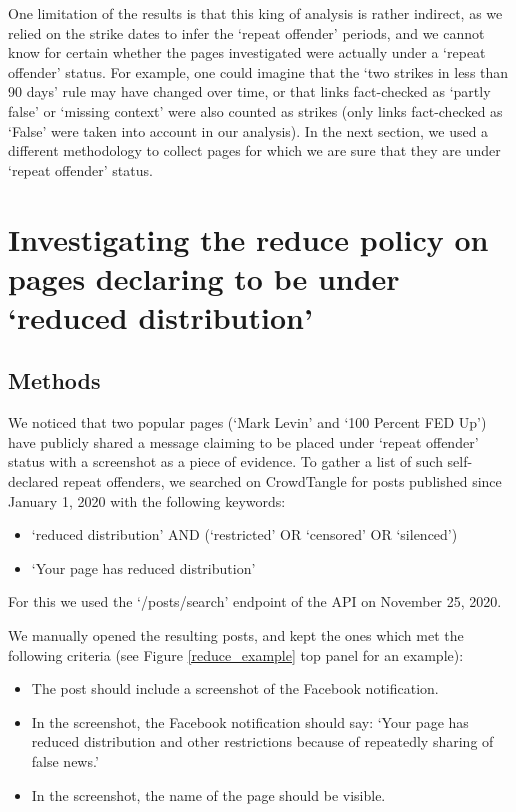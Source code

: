 \documentclass[review]{elsarticle}
\begin{document}
{One limitation of the results is that this king of analysis is rather indirect, as we relied on the strike dates to infer the `repeat offender' periods, and we cannot know for certain whether the pages investigated were actually under a `repeat offender' status. 
For example, one could imagine that the `two strikes in less than 90 days' rule may have changed over time, or that links fact-checked as `partly false' or `missing context' were also counted as strikes (only links fact-checked as `False' were taken into account in our analysis).
In the next section, we used a different methodology to collect pages for which we are sure that they are under `repeat offender' status.

\section{Investigating the reduce policy on pages declaring to be under `reduced distribution'} 

\subsection{Methods}

We noticed that two popular pages (`Mark Levin' and `100 Percent FED Up') have publicly shared a message claiming to be placed under `repeat offender' status with a screenshot as a piece of evidence.
To gather a list of such self-declared repeat offenders, we searched on CrowdTangle for posts published since January 1, 2020 with the following keywords:
\begin{itemize}
\item `reduced distribution' AND (`restricted' OR `censored' OR `silenced')
\item `Your page has reduced distribution'
\end{itemize}
For this we used the `/posts/search' endpoint of the API on November 25, 2020. 

We manually opened the resulting posts, and kept the ones which met the following criteria (see Figure \ref{reduce_example} top panel for an example):
\begin{itemize}
\item The post should include a screenshot of the Facebook notification.
\item In the screenshot, the Facebook notification should say: `Your page has reduced distribution and other restrictions because of repeatedly sharing of false news.'
\item In the screenshot, the name of the page should be visible.
\end{itemize}

}
\end{document}

